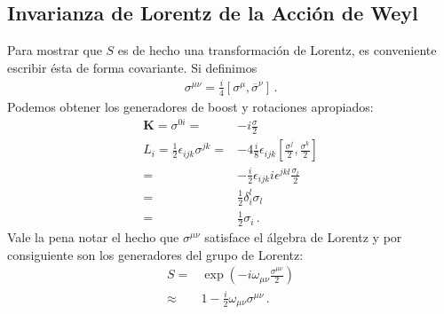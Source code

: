 \subsection{Invarianza de  Lorentz de la Acción de  Weyl}

\begin{frame}
  Para mostrar que $S$ es de hecho una transformación de Lorentz, es conveniente escribir ésta de forma covariante. Si definimos
\begin{align}
  \sigma^{\mu\nu}=\frac{i}{4}\left[\sigma^\mu,\overline{\sigma}^\nu\right]\,.
\end{align}
Podemos obtener los generadores de boost y rotaciones apropiados:
\begin{align*}
 \boldsymbol{K}= \sigma^{0i}=&-i\frac{\sigma}{2}\nonumber\\
 L_{i}=\frac{1}{2}\epsilon_{ijk}\sigma^{jk}=&-4\frac{i}{8}\epsilon_{ijk}\left[\frac{\sigma^j}{2},\frac{\sigma^k}{2}  \right]\nonumber\\
=&-\tfrac{i}{2}\epsilon_{ijk}i\epsilon^{jkl}\frac{\sigma_l}{2}\nonumber\\
=&\tfrac{1}{2}\delta_i^l\sigma_l\nonumber\\
=&\tfrac{1}{2}\sigma_i\,.
\end{align*}
Vale la pena notar el hecho que $\sigma^{\mu\nu}$ satisface el álgebra de Lorentz y por consiguiente son los generadores del grupo de Lorentz:
\begin{align}
  S=&\exp\left(-i \omega_{\mu\nu}\frac{\sigma^{\mu\nu}}{2}\right)\nonumber\\
  \approx&1-\frac{i}{2} \omega_{\mu\nu}{\sigma^{\mu\nu}}\,.
\end{align}



\end{frame}
